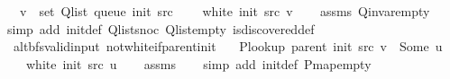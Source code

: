 \begin{isabellebody}
\ \ \ {\isachardoublequoteopen}v\ {\isasymin}\ set\ {\isacharparenleft}{\kern0pt}Q{\isacharunderscore}{\kern0pt}list\ {\isacharparenleft}{\kern0pt}queue\ {\isacharparenleft}{\kern0pt}init\ src{\isacharparenright}{\kern0pt}{\isacharparenright}{\kern0pt}{\isacharparenright}{\kern0pt}{\isachardoublequoteclose}\isanewline
\ \ \ {\isachardoublequoteopen}{\isasymnot}\ white\ {\isacharparenleft}{\kern0pt}init\ src{\isacharparenright}{\kern0pt}\ v{\isachardoublequoteclose}%
\endisataginvisible
{\isafoldinvisible}%
%
\isadeliminvisible
\isanewline
%
\endisadeliminvisible
%
\isadelimproof
\ \ %
\endisadelimproof
%
\isatagproof
{}\isamarkupfalse%
\ assms\ Q{\isachardot}{\kern0pt}invar{\isacharunderscore}{\kern0pt}empty\isanewline
\ \ \isamarkupfalse%
\ {\isacharparenleft}{\kern0pt}simp\ add{\isacharcolon}{\kern0pt}\ init{\isacharunderscore}{\kern0pt}def\ Q{\isachardot}{\kern0pt}list{\isacharunderscore}{\kern0pt}snoc\ Q{\isachardot}{\kern0pt}list{\isacharunderscore}{\kern0pt}empty\ is{\isacharunderscore}{\kern0pt}discovered{\isacharunderscore}{\kern0pt}def{\isacharparenright}{\kern0pt}%
\endisatagproof
{\isafoldproof}%
%
\isadelimproof
\isanewline
%
\endisadelimproof
%
\isadeliminvisible
\isanewline
%
\endisadeliminvisible
%
\isataginvisible
{}\isamarkupfalse%
\ {\isacharparenleft}{\kern0pt}\ alt{\isacharunderscore}{\kern0pt}bfs{\isacharunderscore}{\kern0pt}valid{\isacharunderscore}{\kern0pt}input{\isacharparenright}{\kern0pt}\ not{\isacharunderscore}{\kern0pt}white{\isacharunderscore}{\kern0pt}if{\isacharunderscore}{\kern0pt}parent{\isacharunderscore}{\kern0pt}init{\isacharcolon}{\kern0pt}\isanewline
\ \ \ {\isachardoublequoteopen}P{\isacharunderscore}{\kern0pt}lookup\ {\isacharparenleft}{\kern0pt}parent\ {\isacharparenleft}{\kern0pt}init\ src{\isacharparenright}{\kern0pt}{\isacharparenright}{\kern0pt}\ v\ {\isacharequal}{\kern0pt}\ Some\ u{\isachardoublequoteclose}\isanewline
\ \ \ {\isachardoublequoteopen}{\isasymnot}\ white\ {\isacharparenleft}{\kern0pt}init\ src{\isacharparenright}{\kern0pt}\ u{\isachardoublequoteclose}%
\endisataginvisible
{\isafoldinvisible}%
%
\isadeliminvisible
\isanewline
%
\endisadeliminvisible
%
\isadelimproof
\ \ %
\endisadelimproof
%
\isatagproof
{}\isamarkupfalse%
\ assms\isanewline
\ \ \isamarkupfalse%
\ {\isacharparenleft}{\kern0pt}simp\ add{\isacharcolon}{\kern0pt}\ init{\isacharunderscore}{\kern0pt}def\ P{\isachardot}{\kern0pt}map{\isacharunderscore}{\kern0pt}empty{\isacharparenright}{\kern0pt}%

\end{isabellebody}
